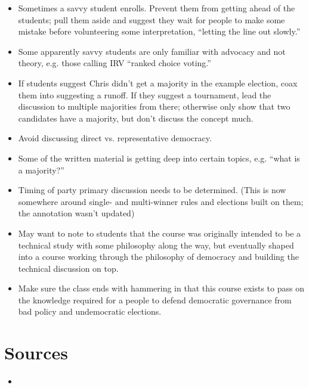 \begin{itemize}
    \item Sometimes a savvy student enrolls.  Prevent them from getting ahead of the students; pull them aside and suggest they wait for people to make some mistake before volunteering some interpretation, ``letting the line out slowly.''

    \item Some apparently savvy students are only familiar with advocacy and not theory, e.g. those calling IRV ``ranked choice voting.''

    \item If students suggest Chris didn't get a majority in the example election, coax them into suggesting a runoff.  If they suggest a tournament, lead the discussion to multiple majorities from there; otherwise only show that two candidates have a majority, but don't discuss the concept much.

    \item Avoid discussing direct vs. representative democracy.

    \item Some of the written material is getting deep into certain topics, e.g. ``what is a majority?''

    \item Timing of party primary discussion needs to be determined.  (This is now somewhere around single- and multi-winner rules and elections built on them; the annotation wasn't updated)

    \item May want to note to students that the course was originally intended to be a technical study with some philosophy along the way, but eventually shaped into a course working through the philosophy of democracy and building the technical discussion on top.

    \item Make sure the class ends with hammering in that this course exists to pass on the knowledge required for a people to defend democratic governance from bad policy and undemocratic elections.
\end{itemize}

\section{Sources}

\begin{itemize}
    \item \autocite{Kassner2006}
\end{itemize}

